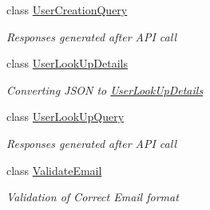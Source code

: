 \begin{DoxyCompactItemize}
class \hyperlink{class_giift_a_p_i_c_sharp_1_1_user_creation_query}{User\+Creation\+Query}
\begin{DoxyCompactList}\small\item\em Responses generated after A\+PI call \end{DoxyCompactList}\item 
class \hyperlink{class_giift_a_p_i_c_sharp_1_1_user_look_up_details}{User\+Look\+Up\+Details}
\begin{DoxyCompactList}\small\item\em Converting J\+S\+ON to \hyperlink{class_giift_a_p_i_c_sharp_1_1_user_look_up_details}{User\+Look\+Up\+Details} \end{DoxyCompactList}\item 
class \hyperlink{class_giift_a_p_i_c_sharp_1_1_user_look_up_query}{User\+Look\+Up\+Query}
\begin{DoxyCompactList}\small\item\em Responses generated after A\+PI call \end{DoxyCompactList}\item 
class \hyperlink{class_giift_a_p_i_c_sharp_1_1_validate_email}{Validate\+Email}
\begin{DoxyCompactList}\small\item\em Validation of Correct Email format \end{DoxyCompactList}\end{DoxyCompactItemize}
